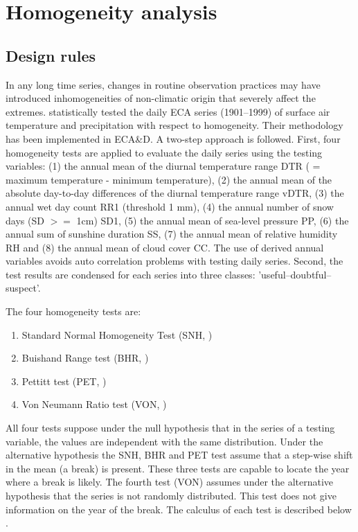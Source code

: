 \documentclass[a4paper,11pt]{article}
\begin{document}
\section{Homogeneity analysis}
\label{sec:homo}
\subsection{Design rules}
\label{sec:homorules}

In any long time series, changes in routine observation practices may
have introduced inhomogeneities of non-climatic origin that severely
affect the extremes. \citet{wijngaard} statistically tested the daily
ECA series (1901--1999) of surface air temperature and precipitation
with respect to homogeneity. Their methodology has been implemented in
ECA\&D. A two-step approach is followed. First, four homogeneity tests
are applied to evaluate the daily series using the testing variables:
(1) the annual mean of the diurnal temperature range DTR ( = maximum
temperature - minimum temperature), (2) the annual mean of the
absolute day-to-day differences of the diurnal temperature range vDTR,
(3) the annual wet day count RR1 (threshold 1 mm), (4) the annual number 
of snow days (SD $>=$ 1cm) SD1, (5) the annual mean of sea-level pressure PP, 
(6) the annual sum of sunshine duration SS, (7) the annual mean of relative
humidity RH and (8) the annual mean of cloud cover CC. The use of
derived annual variables avoids auto correlation problems with testing
daily series. Second, the test results are condensed for each series
into three classes: 'useful--doubtful--suspect'.

The four homogeneity tests are:
\begin{enumerate}
\item Standard Normal Homogeneity Test (SNH, \citet{alexandersson})
\item Buishand Range test (BHR, \citet{buishand1982})
\item Pettitt test (PET, \citet{pettitt})
\item Von Neumann Ratio test (VON, \citet{vonneumann})
\end{enumerate}
All four tests suppose under the null hypothesis that in the series of
a testing variable, the values are independent with the same
distribution. Under the alternative hypothesis the SNH, BHR and PET
test assume that a step-wise shift in the mean (a break) is
present. These three tests are capable to locate the year where a
break is likely. The fourth test (VON) assumes under the alternative
hypothesis that the series is not randomly distributed. This test does
not give information on the year of the break. The calculus of each
test is described below \citep[from][]{wijngaard}.
\end{document}
